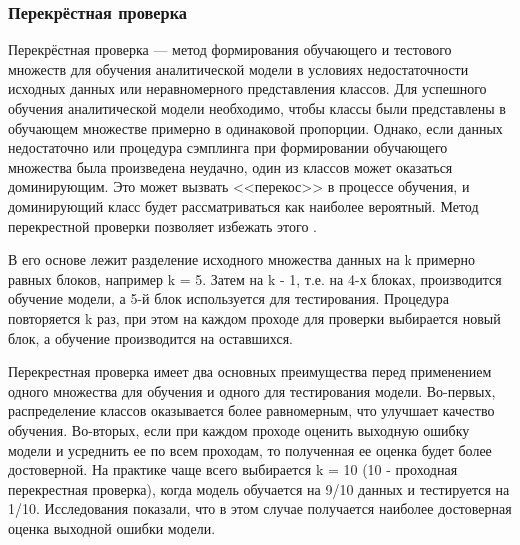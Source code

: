 \subsubsection{Перекрёстная проверка}
\label{sscross-validation}
Перекрёстная проверка --- метод формирования обучающего и тестового множеств для обучения аналитической модели в условиях недостаточности исходных данных или неравномерного представления классов. Для успешного обучения аналитической модели необходимо, чтобы классы были представлены в обучающем множестве примерно в одинаковой пропорции. Однако, если данных недостаточно или процедура сэмплинга при формировании обучающего множества была произведена неудачно, один из классов может оказаться доминирующим. Это может вызвать <<перекос>> в процессе обучения, и доминирующий класс будет рассматриваться как наиболее вероятный. Метод перекрестной проверки позволяет избежать этого \cite{cross-validation}.

В его основе лежит разделение исходного множества данных на k примерно равных блоков, например k = 5. Затем на k - 1, т.е. на 4-х блоках, производится обучение модели, а 5-й блок используется для тестирования. Процедура повторяется k раз, при этом на каждом проходе для проверки выбирается новый блок, а обучение производится на оставшихся.

Перекрестная проверка имеет два основных преимущества перед применением одного множества для обучения и одного для тестирования модели. Во-первых, распределение классов оказывается более равномерным, что улучшает качество обучения. Во-вторых, если при каждом проходе оценить выходную ошибку модели и усреднить ее по всем проходам, то полученная ее оценка будет более достоверной. На практике чаще всего выбирается k = 10 (10 - проходная перекрестная проверка), когда модель обучается на 9/10 данных и тестируется на 1/10. Исследования показали, что в этом случае получается наиболее достоверная оценка выходной ошибки модели.
